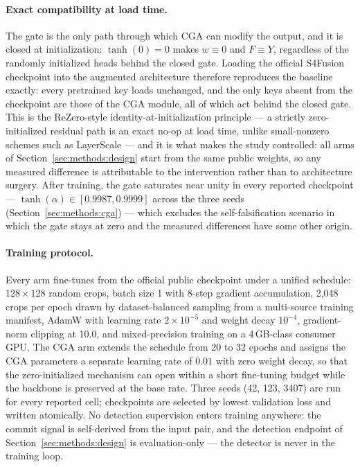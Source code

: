 \documentclass[pdflatex,sn-mathphys-num]{sn-jnl}
\theoremstyle{thmstyleone}%
\theoremstyle{thmstyletwo}%
\theoremstyle{thmstylethree}%
\begin{document}
\paragraph{Exact compatibility at load time.}
The gate is the only path through which CGA can modify the output, and it is closed at initialization: $\tanh(0) = 0$ makes $w \equiv 0$ and $F \equiv Y$, regardless of the randomly initialized heads behind the closed gate. Loading the official S4Fusion checkpoint into the augmented architecture therefore reproduces the baseline exactly: every pretrained key loads unchanged, and the only keys absent from the checkpoint are those of the CGA module, all of which act behind the closed gate. This is the ReZero-style identity-at-initialization principle \cite{bachlechner2021rezero} --- a strictly zero-initialized residual path is an exact no-op at load time, unlike small-nonzero schemes such as LayerScale \cite{touvron2021going} --- and it is what makes the study controlled: all arms of Section~\ref{sec:methods:design} start from the same public weights, so any measured difference is attributable to the intervention rather than to architecture surgery. After training, the gate saturates near unity in every reported checkpoint --- $\tanh(\alpha) \in [0.9987, 0.9999]$ across the three seeds (Section~\ref{sec:methods:cga}) --- which excludes the self-falsification scenario in which the gate stays at zero and the measured differences have some other origin.

\paragraph{Training protocol.}
Every arm fine-tunes from the official public checkpoint under a unified schedule: $128\times 128$ random crops, batch size 1 with 8-step gradient accumulation, 2,048 crops per epoch drawn by dataset-balanced sampling from a multi-source training manifest, AdamW with learning rate $2\times 10^{-5}$ and weight decay $10^{-4}$, gradient-norm clipping at 10.0, and mixed-precision training on a 4\,GB-class consumer GPU. The CGA arm extends the schedule from 20 to 32 epochs and assigns the CGA parameters a separate learning rate of $0.01$ with zero weight decay, so that the zero-initialized mechanism can open within a short fine-tuning budget while the backbone is preserved at the base rate. Three seeds (42, 123, 3407) are run for every reported cell; checkpoints are selected by lowest validation loss and written atomically. No detection supervision enters training anywhere: the commit signal is self-derived from the input pair, and the detection endpoint of Section~\ref{sec:methods:design} is evaluation-only --- the detector is never in the training loop.
\end{document}
